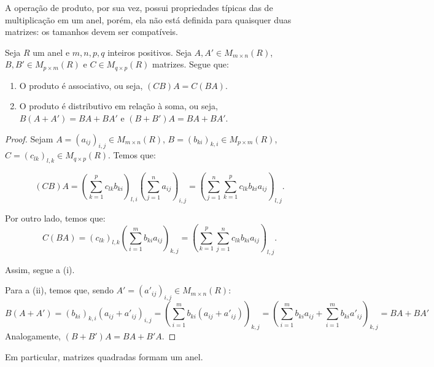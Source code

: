 A operação de produto, por sua vez, possui propriedades típicas das de multiplicação em um anel, porém, ela não está definida para quaisquer duas matrizes: os tamanhos devem ser compatíveis.

\begin{proposition}
    Seja $R$ um anel e $m, n, p, q$ inteiros positivos.
    Seja $A, A'\in M_{m \times n}(R)$, $B, B'\in M_{p \times m}(R)$ e $C\in M_{q \times p}(R)$ matrizes.
    Segue que:
    \begin{enumerate}[label=(\roman*)]
        \item O produto é associativo, ou seja, $(CB)A=C(BA)$.
        \item O produto é distributivo em relação à soma, ou seja, $B(A+A')=BA+BA'$ e $(B+B')A=BA+BA'$.
    \end{enumerate}
\end{proposition}

\begin{proof}
    Sejam $A=(a_{ij})_{i, j}\in M_{m \times n}(R)$, $B=(b_{ki})_{k, i}\in M_{p \times m}(R)$, $C=(c_{lk})_{l, k}\in M_{q \times p}(R)$. Temos que:

    \begin{equation*}
        (CB)A=(\sum_{k=1}^p c_{lk}b_{ki})_{l, i}(\sum_{j=1}^n a_{ij})_{i, j}=(\sum_{j=1}^n\sum_{k=1}^p c_{lk}b_{ki}a_{ij})_{l, j}.
    \end{equation*}

    Por outro lado, temos que:
    \begin{equation*}
        C(BA)=(c_{lk})_{l, k}(\sum_{i=1}^m b_{ki}a_{ij})_{k, j}=(\sum_{k=1}^p \sum_{j=1}^nc_{lk}b_{ki}a_{ij})_{l, j}.
    \end{equation*}

    Assim, segue a (i).

    Para a (ii), temos que, sendo $A'=(a'_{ij})_{i, j}\in M_{m \times n}(R)$:
    \begin{equation*}
        B(A+A')=(b_{ki})_{k, i}(a_{ij}+a'_{ij})_{i, j}=(\sum_{i=1}^m b_{ki}(a_{ij}+a'_{ij}))_{k, j}=(\sum_{i=1}^m b_{ki}a_{ij}+\sum_{i=1}^m b_{ki}a'_{ij})_{k, j}=BA+BA'
    \end{equation*}
    Analogamente, $(B+B')A=BA+B'A$.
\end{proof}

Em particular, matrizes quadradas formam um anel.

